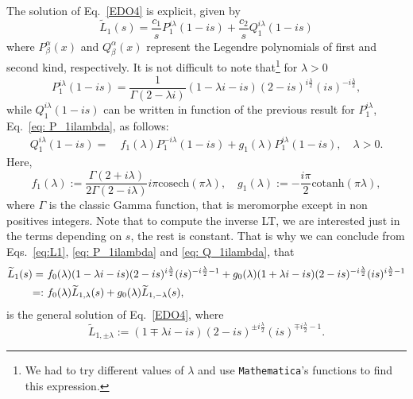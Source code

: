 \documentclass[
 aip,
 jmp,
 amsmath,amssymb,
 reprint,
 nofootinbib,
]{revtex4-2}
\begin{document}
The solution of Eq.~\eqref{EDO4} is explicit, given by
\begin{equation}\label{eq:L1}
    \widetilde L_1(s) = \frac{c_1}{s}P_1^{i \lambda }(1-i s) + \frac{c_2}{s} Q_1^{i \lambda }(1-i s)
\end{equation}
where $P^\alpha_\beta(x)$ and $Q^\alpha_\beta(x)$ represent the Legendre polynomials of first and second kind, respectively. It is not difficult to note that\footnote{We had to try different values of $\lambda$ and use \texttt{Mathematica}'s functions to find this expression.} for $\lambda >0$
\begin{equation}\label{eq: P_1ilambda}
    P_1^{i\lambda}(1-is)=\frac{1}{ \Gamma (2-\lambda i)} (1-\lambda i-i s) (2-i s)^{i\frac{\lambda}{2} } (i s)^{-i\frac{\lambda}{2}},%
\end{equation}
while $Q_1^{i\lambda}(1-is)$ can be written in function of the previous result for $P_1^{i\lambda}$, Eq.~\eqref{eq: P_1ilambda}, as follows:
\begin{equation} \label{eq: Q_1ilambda}
    \begin{aligned}
    Q_1^{i\lambda}(1-is)= &~{} f_1(\lambda)P_1^{-i \lambda }(1-i s) + g_1(\lambda) P_1^{i \lambda }(1-i s), \quad \lambda>0.
    \end{aligned}
\end{equation}
Here,
\begin{equation}\label{eq:f_1 and g_1}
    f_1(\lambda):= \frac{ \Gamma (2+i \lambda)}{2 \Gamma (2-i \lambda )}i \pi  \text{cosech}(\pi  \lambda ), \quad g_1(\lambda) := -\frac{i \pi}{2}   \text{cotanh} (\pi  \lambda ),
\end{equation}
where $\Gamma$ is the classic Gamma function, that is meromorphe except in non positives integers. Note that to compute the inverse LT, we are interested just in the terms depending on $s$, the rest is constant. That is why we can conclude from Eqs.~\eqref{eq:L1}, \eqref{eq: P_1ilambda} and \eqref{eq: Q_1ilambda}, that
\begin{align}
\widetilde L_1(s)= &~{} f_0(\lambda) (1-\lambda i-i s) (2-i s)^{i\frac{\lambda}{2} } (i s)^{-i\frac{\lambda}{2}-1}  + g_0(\lambda) (1+ \lambda i-i s) (2-i s)^{-i\frac{\lambda}{2} } (i s)^{i\frac{\lambda}{2}-1} \notag \\
= : &~{} f_0(\lambda) \widetilde L_{1,\lambda}(s) +  g_0(\lambda) \widetilde L_{1,-\lambda}(s),\label{L1_final}
\end{align}
is the general solution of Eq.~\eqref{EDO4}, where
\begin{equation}\label{singular}
    \widetilde{L}_{1,\pm\lambda} := (1 \mp \lambda i-i s) (2-i s)^{\pm i\frac{\lambda}{2} } (i s)^{\mp i\frac{\lambda}{2}-1}.
\end{equation}
\end{document}
